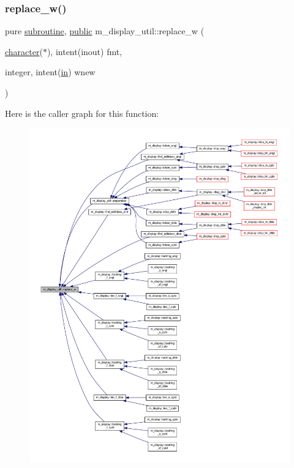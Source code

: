 \subsubsection{\texorpdfstring{replace\+\_\+w()}{replace\_w()}}
{\footnotesize\ttfamily pure \hyperlink{M__stopwatch_83_8txt_acfbcff50169d691ff02d4a123ed70482}{subroutine}, \hyperlink{M__stopwatch_83_8txt_a2f74811300c361e53b430611a7d1769f}{public} m\+\_\+display\+\_\+util\+::replace\+\_\+w (\begin{DoxyParamCaption}\item[{\hyperlink{option__stopwatch_83_8txt_abd4b21fbbd175834027b5224bfe97e66}{character}($\ast$), intent(inout)}]{fmt,  }\item[{integer, intent(\hyperlink{M__journal_83_8txt_afce72651d1eed785a2132bee863b2f38}{in})}]{wnew }\end{DoxyParamCaption})}

Here is the caller graph for this function\+:
\nopagebreak
\begin{figure}[H]
\begin{center}
\leavevmode
\includegraphics[width=350pt]{namespacem__display__util_a76a458454b83026c12d4a90882f2719e_icgraph}
\end{center}
\end{figure}
\mbox{\label{namespacem__display__util_a72816de72f8a35ed93223a4bfd650c9b}} 
